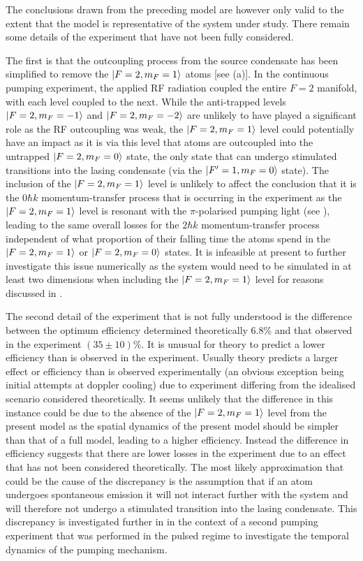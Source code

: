 The conclusions drawn from the preceding model are however only valid to the extent that the model is representative of the system under study.  There remain some details of the experiment that have not been fully considered.

The first is that the outcoupling process from the source condensate has been simplified to remove the ${\left|F=2, m_F = 1\right>}$ atoms [see (a)].  In the continuous pumping experiment, the applied RF radiation coupled the entire $F=2$ manifold, with each level coupled to the next.  While the anti-trapped levels ${\left|F=2, m_F=-1\right>}$ and ${\left|F=2, m_F=-2\right>}$ are unlikely to have played a significant role as the RF outcoupling was weak, the ${\left|F=2, m_F=1\right>}$ level could potentially have an impact as it is via this level that atoms are outcoupled into the untrapped ${\left|F=2, m_F=0\right>}$ state, the only state that can undergo stimulated transitions into the lasing condensate (via the ${\left|F'=1, m_F=0\right>}$ state).  The inclusion of the ${\left|F=2, m_F=1\right>}$ level is unlikely to affect the conclusion that it is the $0 \hbar k$ momentum-transfer process that is occurring in the experiment as the ${\left|F=2, m_F=1\right>}$ level is resonant with the $\pi$-polarised pumping light (see ), leading to the same overall losses for the $2 \hbar k$ momentum-transfer process independent of what proportion of their falling time the atoms spend in the ${\left|F=2, m_F=1\right>}$ or ${\left|F=2, m_F=0\right>}$ states.  It is infeasible at present to further investigate this issue numerically as the system would need to be simulated in at least two dimensions when including the ${\left|F=2, m_F=1\right>}$ level for reasons discussed in .

The second detail of the experiment that is not fully understood is the difference between the optimum efficiency determined theoretically 6.8\% and that observed in the experiment $(35\pm 10)\%$.  It is unusual for theory to predict a lower efficiency than is observed in the experiment.  Usually theory predicts a larger effect or efficiency than is observed experimentally (an obvious exception being initial attempts at doppler cooling) due to experiment differing from the idealised scenario considered theoretically.  It seems unlikely that the difference in this instance could be due to the absence of the ${\left|F=2, m_F=1\right>}$ level from the present model as the spatial dynamics of the present model should be simpler than that of a full model, leading to a higher efficiency.  Instead the difference in efficiency suggests that there are lower losses in the experiment due to an effect that has not been considered theoretically.  The most likely approximation that could be the cause of the discrepancy is the assumption that if an atom undergoes spontaneous emission it will not interact further with the system and will therefore not undergo a stimulated transition into the lasing condensate.  This discrepancy is investigated further in  in the context of a second pumping experiment that was performed in the pulsed regime to investigate the temporal dynamics of the pumping mechanism.

